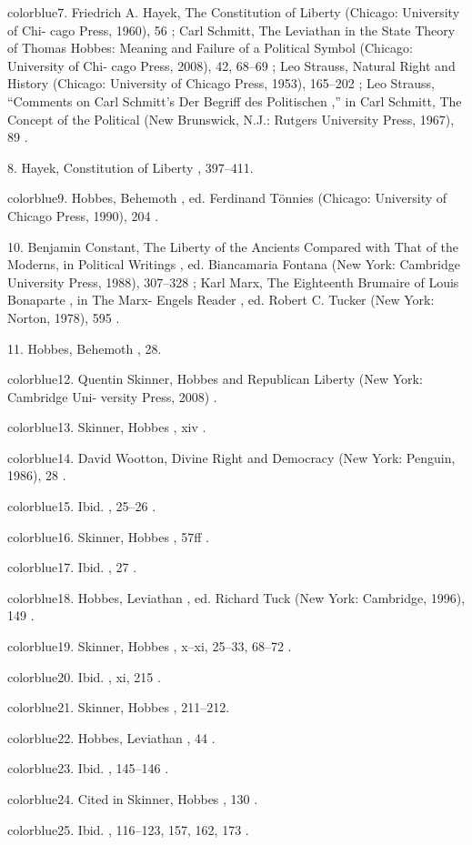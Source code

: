 	{color{blue}7}. Friedrich A. Hayek, The Constitution of Liberty (Chicago: University of Chi- cago Press, 1960), 56 ; Carl Schmitt, The Leviathan in the State Theory of Thomas Hobbes: Meaning and Failure of a Political Symbol (Chicago: University of Chi- cago Press, 2008), 42, 68–69 ; Leo Strauss, Natural Right and History (Chicago: University of Chicago Press, 1953), 165–202 ; Leo Strauss, “Comments on Carl Schmitt’s Der Begriff des Politischen ,” in Carl Schmitt, The Concept of the Political (New Brunswick, N.J.: Rutgers University Press, 1967), 89 .


	{\color{blue}8}. Hayek, Constitution of Liberty , 397–411.


	{color{blue}9}. Hobbes, Behemoth , ed. Ferdinand Tönnies (Chicago: University of Chicago Press, 1990), 204 .


	{\color{blue}10}. Benjamin Constant, The Liberty of the Ancients Compared with That of the Moderns, in Political Writings , ed. Biancamaria Fontana (New York: Cambridge University Press, 1988), 307–328 ; Karl Marx, The Eighteenth Brumaire of Louis Bonaparte , in The Marx- Engels Reader , ed. Robert C. Tucker (New York: Norton, 1978), 595 .


	{\color{blue}11}. Hobbes, Behemoth , 28.


	{color{blue}12}. Quentin Skinner, Hobbes and Republican Liberty (New York: Cambridge Uni- versity Press, 2008) .


	{color{blue}13}. Skinner, Hobbes , xiv .


	{color{blue}14}. David Wootton, Divine Right and Democracy (New York: Penguin, 1986), 28 .


	{color{blue}15}. Ibid. , 25–26 .


	{color{blue}16}. Skinner, Hobbes , 57ff .


	{color{blue}17}. Ibid. , 27 .


	{color{blue}18}. Hobbes, Leviathan , ed. Richard Tuck (New York: Cambridge, 1996), 149 .


	{color{blue}19}. Skinner, Hobbes , x–xi, 25–33, 68–72 .


	{color{blue}20}. Ibid. , xi, 215 .


	{color{blue}21}. Skinner, Hobbes , 211–212.


	{color{blue}22}. Hobbes, Leviathan , 44 .


	{color{blue}23}. Ibid. , 145–146 .


	{color{blue}24}. Cited in Skinner, Hobbes , 130 .


	{color{blue}25}. Ibid. , 116–123, 157, 162, 173 .


